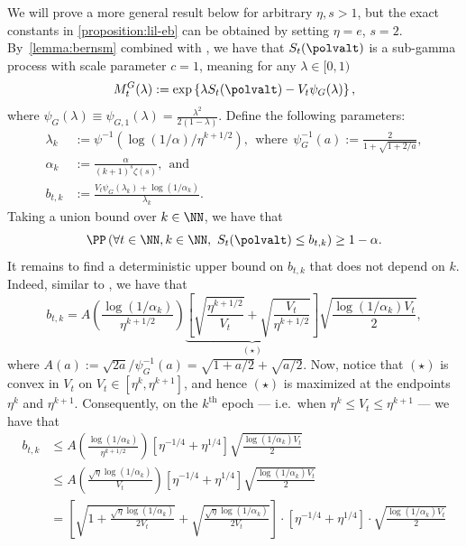We will prove a more general result below for arbitrary $\eta, s > 1$, but the exact constants in \cref{proposition:lil-eb} can be obtained by setting $\eta = e$, $s = 2$. By~\cref{lemma:bernsm} combined with \citet[Table 5, row 7]{howard_exponential_2018}, we have that $S_t(\polvalt)$ is a sub-gamma process with scale parameter $c = 1$, meaning for any $\lambda \in [0, 1)$
\begin{equation}
  M_t^G(\lambda) := \exp \left \{ \lambda S_t(\polvalt) - V_t \psi_{G}(\lambda) \right \},
\end{equation}
where $\psi_G(\lambda) \equiv \psi_{G,1}(\lambda) = \frac{\lambda^2 }{ 2(1-\lambda) }$. Define the following parameters:
\begin{align*}
  \lambda_k &:= \psi^{-1}(\log(1/\alpha) / \eta^{k+1/2}), ~~\text{where}~~\psi^{-1}_G(a) := \frac{2}{1 + \sqrt{1 + 2/a}},\\
  \alpha_k &:= \frac{\alpha}{(k+1)^s \zeta(s)},~~\text{and}\\
  b_{t,k} &:= \frac{V_t \psi_G (\lambda_k) + \log(1/\alpha_k)}{\lambda_k}.
\end{align*}
Taking a union bound over $k \in \NN$, we have that
\begin{equation*}
  \PP \left ( \forall t \in \NN, k \in \NN,\ S_t(\polvalt) \leq b_{t,k} \right ) \geq 1-\alpha.
\end{equation*}
It remains to find a deterministic upper bound on $b_{t,k}$ that does not depend on $k$. Indeed, similar to \citet[Eq. (39)]{howard2018uniform}, we have that
\begin{equation}
  b_{t, k} = A \left ( \frac{\log(1/\alpha_k)}{\eta^{k+1/2}} \right ) \underbrace{\left [ \sqrt{\frac{\eta^{k+1/2}}{V_t}} + \sqrt{\frac{V_t}{\eta^{k+1/2}}} \right ]}_{(\star)} \sqrt{\frac{\log(1/\alpha_k) V_t}{2}},
\end{equation}
where $A(a) := \sqrt{2a} / \psi^{-1}_G(a) = \sqrt{1 + a/2} + \sqrt{a/2}$. Now, notice that $(\star)$ is convex in $V_t$ on $V_t \in [\eta^k, \eta^{k+1}]$, and hence $(\star)$ is maximized at the endpoints $\eta^{k}$ and $\eta^{k+1}$. Consequently, on the $k^\mathrm{th}$ epoch --- i.e.~when $\eta^k \leq V_t \leq \eta^{k+1}$ --- we have that
\begin{align}
  b_{t,k} &\leq A \left ( \frac{\log(1/\alpha_{k})}{\eta^{k+1/2}}  \right ) \left [ \eta^{-1/4} + \eta^{1/4} \right ] \sqrt{\frac{\log(1/\alpha_k) V_t}{2}} \nonumber \\
          &\leq A \left ( \frac{\sqrt{\eta}\log(1/\alpha_{k})}{V_t}  \right ) \left [ \eta^{-1/4} + \eta^{1/4} \right ] \sqrt{\frac{\log(1/\alpha_k) V_t}{2}} \nonumber \\
          &= \left [ \sqrt{1+\frac{\sqrt{\eta} \log(1/\alpha_k)}{2V_t}} + \sqrt{\frac{\sqrt{\eta}\log(1/\alpha_k)}{2V_t}} \right ] \cdot \left [ \eta^{-1/4} + \eta^{1/4} \right ] \cdot \sqrt{\frac{\log(1/\alpha_k)V_t}{2}} \label{eq:proof-lil-eb-line1}
\end{align}
